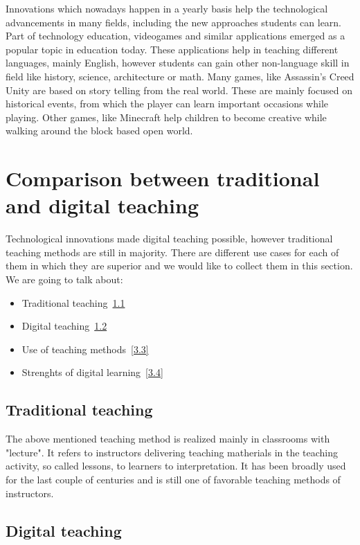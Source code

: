 \documentclass[10pt,oneside,english,a4paper]{article}
\begin{document}
	Innovations which nowadays happen in a yearly basis  help the technological advancements in many fields, including the new approaches students can learn. Part of technology education, videogames and similar applications emerged as a popular topic
in education today\cite{Okur2017}. These applications help in teaching different languages, mainly English, however students can gain other non-language skill in field like history, science, architecture or math. Many games, like Assassin's Creed Unity are based on story telling from the real world. These are mainly focused on historical events, from which the player can learn important occasions while playing. Other games, like Minecraft help children to become creative while walking around the block based open world. 

\section{Comparison between traditional and digital teaching}\label{comparison}

	Technological innovations made digital teaching possible, however traditional teaching methods are still in majority. There are different use cases for each of them in which they are superior and we would like to collect them in this section. We are going to talk about:

\begin{itemize}
\item Traditional teaching~\ref{3.1}
\item Digital teaching~\ref{3.2}
\item Use of teaching methods~\ref{3.3}
\item Strenghts of digital learning~\ref{3.4}
\end{itemize}

\subsection{Traditional teaching}\label{3.1}

	The above mentioned teaching method is realized mainly in classrooms with "lecture". It refers to instructors delivering teaching matherials in the teaching activity, so called lessons, to learners to interpretation. It has been broadly used for the last couple of centuries and is still one of favorable teaching methods of instructors.\cite{Lin2017}

\subsection{Digital teaching}\label{3.2}
\end{document}
